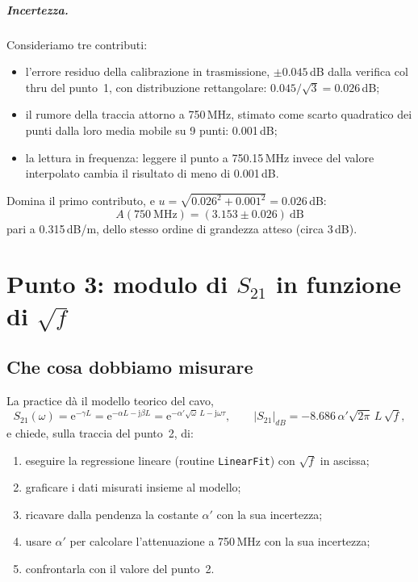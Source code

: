 \documentclass[11pt,a4paper,oneside]{book}
\begin{document}
\paragraph{Incertezza.} Consideriamo tre contributi:
\begin{itemize}
  \item l'errore residuo della calibrazione in trasmissione, $\pm0.045$\,dB dalla verifica col thru del punto~1, con distribuzione rettangolare: $0.045/\sqrt3 = 0.026$\,dB;
  \item il rumore della traccia attorno a 750\,MHz, stimato come scarto quadratico dei punti dalla loro media mobile su 9 punti: 0.001\,dB;
  \item la lettura in frequenza: leggere il punto a 750.15\,MHz invece del valore interpolato cambia il risultato di meno di 0.001\,dB.
\end{itemize}
Domina il primo contributo, e $u = \sqrt{0.026^2+0.001^2} = 0.026$\,dB:
\begin{equation}
\boxed{A(750\ \mathrm{MHz}) = (3.153 \pm 0.026)\ \mathrm{dB}}
\end{equation}
pari a 0.315\,dB/m, dello stesso ordine di grandezza atteso (circa 3\,dB).

\chapter[Punto 3: fit in funzione di \texorpdfstring{$\sqrt f$}{sqrt(f)}]{Punto 3: modulo di \texorpdfstring{$S_{21}$}{S21} in funzione di \texorpdfstring{$\sqrt f$}{sqrt(f)}}

\section{Che cosa dobbiamo misurare}
La practice dà il modello teorico del cavo,
\begin{equation}
S_{21}(\omega) = \mathrm{e}^{-\gamma L} = \mathrm{e}^{-\alpha L-\mathrm{j}\beta L} = \mathrm{e}^{-\alpha'\sqrt\omega\,L-\mathrm{j}\omega\tau},
\qquad |S_{21}|_{dB} = -8.686\,\alpha'\sqrt{2\pi}\,L\,\sqrt f ,
\label{eq:modello}
\end{equation}
e chiede, sulla traccia del punto~2, di:
\begin{enumerate}
  \item eseguire la regressione lineare (routine \texttt{LinearFit}) con $\sqrt f$ in ascissa;
  \item graficare i dati misurati insieme al modello;
  \item ricavare dalla pendenza la costante $\alpha'$ con la sua incertezza;
  \item usare $\alpha'$ per calcolare l'attenuazione a 750\,MHz con la sua incertezza;
  \item confrontarla con il valore del punto~2.
\end{enumerate}
\end{document}
